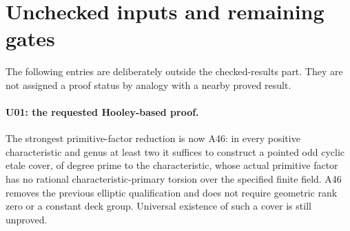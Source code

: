 \section{Unchecked inputs and remaining gates}
\label{sec:remaining}

The following entries are deliberately outside the checked-results
part. They are not assigned a proof status by analogy with a nearby
proved result.

\paragraph{U01: the requested Hooley-based proof.}
The strongest primitive-factor reduction is now A46: in every positive
characteristic and genus at least two it suffices to construct a pointed
odd cyclic etale cover, of degree prime to the characteristic, whose
actual primitive factor has no rational characteristic-primary torsion
over the specified finite field. A46 removes the previous elliptic
qualification and does not require geometric rank zero or a constant
deck group. Universal existence of such a cover is still unproved.

